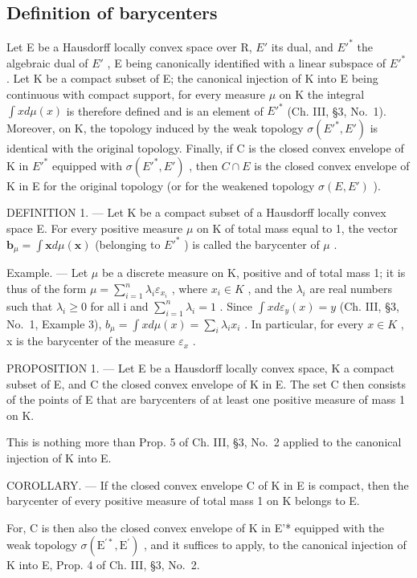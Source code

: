 \subsection{Definition of barycenters}

Let E be a Hausdorff locally convex space over R, \(E'\) its dual, and \(E'^{*}\) the algebraic dual of \(E'\) , E being canonically identified with a linear subspace of \(E'^{*}\) . Let K be a compact subset of E; the canonical injection of K into E being continuous with compact support, for every measure \(\mu\) on K the integral \(\int x d\mu(x)\) is therefore defined and is an element of \(E'^{*}\) (Ch. III, §3, No.~1). Moreover, on K, the topology induced by the weak topology \(\sigma(E'^{*}, E')\) is identical with the original topology. Finally, if C is the closed convex envelope of K in \(E'^{*}\) equipped with \(\sigma(E'^{*}, E')\) , then \(C \cap E\) is the closed convex envelope of K in E for the original topology (or for the weakened topology \(\sigma(E, E')\) ).

DEFINITION 1. --- Let K be a compact subset of a Hausdorff locally convex space E. For every positive measure \(\mu\) on K of total mass equal to 1, the vector \(\mathbf{b}_{\mu} = \int \mathbf{x} d\mu(\mathbf{x})\) (belonging to \(E'^{*}\) ) is called the barycenter of \(\mu\) .

Example. --- Let \(\mu\) be a discrete measure on K, positive and of total mass 1; it is thus of the form \(\mu = \sum_{i=1}^{n} \lambda_i \varepsilon_{x_i}\) , where \(x_i \in K\) , and the \(\lambda_i\) are real numbers such that \(\lambda_i \geqslant 0\) for all i and \(\sum_{i=1}^{n} \lambda_i = 1\) . Since \(\int x d\varepsilon_y(x) = y\) (Ch. III, §3, No.~1, Example 3), \(b_\mu = \int x d\mu(x) = \sum_{i} \lambda_i x_i\) . In particular, for every \(x \in K\) , x is the barycenter of the measure \(\varepsilon_x\) .

PROPOSITION 1. --- Let E be a Hausdorff locally convex space, K a compact subset of E, and C the closed convex envelope of K in E. The set C then consists of the points of E that are barycenters of at least one positive measure of mass 1 on K.

This is nothing more than Prop. 5 of Ch. III, §3, No.~2 applied to the canonical injection of K into E.

COROLLARY. --- If the closed convex envelope C of K in E is compact, then the barycenter of every positive measure of total mass 1 on K belongs to E.

For, C is then also the closed convex envelope of K in E'* equipped with the weak topology \(\sigma (\mathrm{E}^{\prime *},\mathrm{E}^{\prime})\) , and it suffices to apply, to the canonical injection of K into E, Prop. 4 of Ch. III, §3, No.~2.

